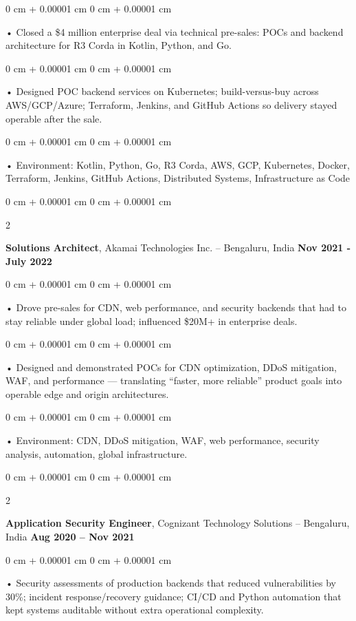 \documentclass[10pt, letterpaper]{article}
\newenvironment{onecolentry}{
    \begin{adjustwidth}{
        0 cm + 0.00001 cm
    }{
        0 cm + 0.00001 cm
    }
}{
    \end{adjustwidth}
} %
\newenvironment{twocolentry}[2][]{
    \onecolentry
    \def\secondColumn{#2}
    \setcolumnwidth{\fill, 4.5 cm}
    \begin{paracol}{2}
}{
    \switchcolumn \raggedleft \secondColumn
    \end{paracol}
    \endonecolentry
} %
\begin{document}
        \begin{onecolentry}
             • Closed a \$4 million enterprise deal via technical pre-sales: POCs and backend architecture for R3 Corda in Kotlin, Python, and Go.
        \end{onecolentry}
        \begin{onecolentry}
             • Designed POC backend services on Kubernetes; build-versus-buy across AWS/GCP/Azure; Terraform, Jenkins, and GitHub Actions so delivery stayed operable after the sale.
        \end{onecolentry}
        \begin{onecolentry}
             • Environment: Kotlin, Python, Go, R3 Corda, AWS, GCP, Kubernetes, Docker, Terraform, Jenkins, GitHub Actions, Distributed Systems, Infrastructure as Code
        \end{onecolentry}
        \vspace{0.1cm}

        \begin{twocolentry}{
            \textbf{Nov 2021 - July 2022}
        }
            \textbf{Solutions Architect}, Akamai Technologies Inc. -- Bengaluru, India \end{twocolentry}
        \begin{onecolentry}
            • Drove pre-sales for CDN, web performance, and security backends that had to stay reliable under global load; influenced \$20M+ in enterprise deals.
        \end{onecolentry}
        \begin{onecolentry}
            • Designed and demonstrated POCs for CDN optimization, DDoS mitigation, WAF, and performance — translating ``faster, more reliable'' product goals into operable edge and origin architectures.
        \end{onecolentry}
        \begin{onecolentry}
             • Environment: CDN, DDoS mitigation, WAF, web performance, security analysis, automation, global infrastructure.
        \end{onecolentry}

        \begin{twocolentry}{
            \textbf{Aug 2020 – Nov 2021}
        }
            \vspace{2 pt }
            \textbf{Application Security Engineer}, Cognizant Technology Solutions -- Bengaluru, India\end{twocolentry}
        \begin{onecolentry}
             • Security assessments of production backends that reduced vulnerabilities by 30\%; incident response/recovery guidance; CI/CD and Python automation that kept systems auditable without extra operational complexity.
        \end{onecolentry}
\end{document}
